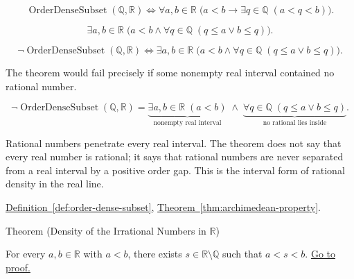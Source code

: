 \begin{remark*}
\[
\operatorname{OrderDenseSubset}(\mathbb{Q},\mathbb{R})\Longleftrightarrow
\forall a,b\in\mathbb{R}\;\bigl(a<b\rightarrow \exists q\in\mathbb{Q}\;(a<q<b)\bigr).
\]
\end{remark*}

\begin{remark*}
\[
\exists a,b\in\mathbb{R}\;\bigl(a<b\land \forall q\in\mathbb{Q}\;(q\le a\lor b\le q)\bigr).
\]
\end{remark*}

\begin{remark*}
\[
\neg\operatorname{OrderDenseSubset}(\mathbb{Q},\mathbb{R})\Longleftrightarrow
\exists a,b\in\mathbb{R}\;\bigl(a<b\land \forall q\in\mathbb{Q}\;(q\le a\lor b\le q)\bigr).
\]
\end{remark*}

\begin{remark*}
The theorem would fail precisely if some nonempty real interval contained no rational number.
\end{remark*}

\begin{remark*}
\[
\neg\operatorname{OrderDenseSubset}(\mathbb{Q},\mathbb{R})
=
\underbrace{\exists a,b\in\mathbb{R}\;(a<b)}_{\text{nonempty real interval}}
\;\land\;
\underbrace{\forall q\in\mathbb{Q}\;(q\le a\lor b\le q)}_{\text{no rational lies inside}}.
\]
\end{remark*}

\begin{remark*}[Interpretation]
Rational numbers penetrate every real interval. The theorem does not say that every real number is rational; it says that rational numbers are never separated from a real interval by a positive order gap. This is the interval form of rational density in the real line.
\end{remark*}

\begin{remark*}[Dependencies]
\hyperref[def:order-dense-subset]{Definition~\ref*{def:order-dense-subset}},
\hyperref[thm:archimedean-property]{Theorem~\ref*{thm:archimedean-property}}.
\end{remark*}








\begin{theorembox}{Theorem (Density of the Irrational Numbers in $\mathbb{R}$)}
\begin{theorem}
\label{thm:density-of-irrationals-in-reals}
For every $a,b\in\mathbb{R}$ with $a<b$, there exists $s\in\mathbb{R}\setminus\mathbb{Q}$ such that $a<s<b$.
\hyperref[prf:density-of-irrationals-in-reals]{Go to proof.}
\end{theorem}
\end{theorembox}

